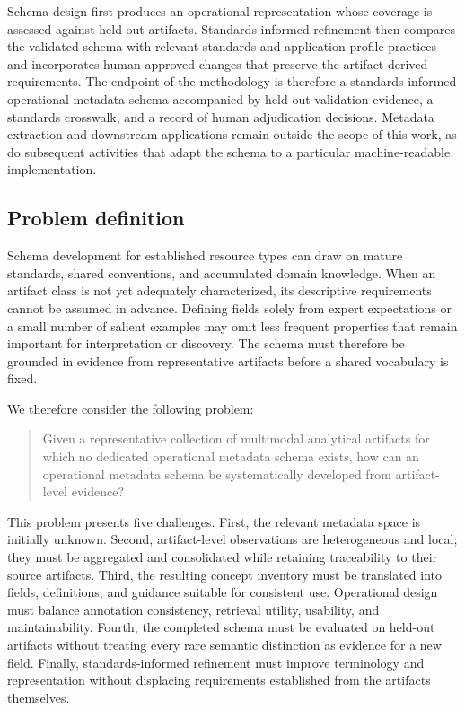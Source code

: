 \documentclass{article}
\begin{document}
Schema design first produces an operational representation whose coverage is assessed against held-out artifacts. Standards-informed refinement then compares the validated schema with relevant standards and application-profile practices and incorporates human-approved changes that preserve the artifact-derived requirements. The endpoint of the methodology is therefore a standards-informed operational metadata schema accompanied by held-out validation evidence, a standards crosswalk, and a record of human adjudication decisions. Metadata extraction and downstream applications remain outside the scope of this work, as do subsequent activities that adapt the schema to a particular machine-readable implementation.

\subsection{Problem definition}

Schema development for established resource types can draw on mature standards, shared conventions, and accumulated domain knowledge. When an artifact class is not yet adequately characterized, its descriptive requirements cannot be assumed in advance. Defining fields solely from expert expectations or a small number of salient examples may omit less frequent properties that remain important for interpretation or discovery. The schema must therefore be grounded in evidence from representative artifacts before a shared vocabulary is fixed.

We therefore consider the following problem:

\begin{quote}
Given a representative collection of multimodal analytical artifacts for which no dedicated operational metadata schema exists, how can an operational metadata schema be systematically developed from artifact-level evidence?
\end{quote}

This problem presents five challenges. First, the relevant metadata space is initially unknown. Second, artifact-level observations are heterogeneous and local; they must be aggregated and consolidated while retaining traceability to their source artifacts. Third, the resulting concept inventory must be translated into fields, definitions, and guidance suitable for consistent use. Operational design must balance annotation consistency, retrieval utility, usability, and maintainability. Fourth, the completed schema must be evaluated on held-out artifacts without treating every rare semantic distinction as evidence for a new field. Finally, standards-informed refinement must improve terminology and representation without displacing requirements established from the artifacts themselves.
\end{document}
